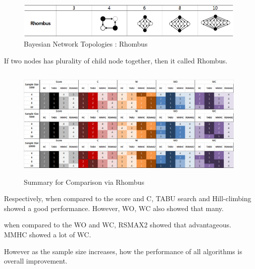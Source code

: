	\begin{figure}[h]
	\centering
		\includegraphics[height=50pt]{images/Topologies_Rhombus}
		\caption{Bayesian Network Topologies : Rhombus}
	\end{figure}	

	If two nodes has plurality of child node together, then it called Rhombus.

\begin{figure}[!bhp]
	\centering
		\includegraphics[height=155pt]{images/Result_Rhombus}
		\caption{Summary for Comparison via Rhombus}
	\end{figure}	

Respectively, when compared to the score and C,  TABU search and Hill-climbing showed a good performance. However, WO, WC also showed that many.

when compared to the WO and WC, RSMAX2 showed that advantageous. MMHC showed a lot of WC.

However as the sample size increases, how the performance of all algorithms is overall improvement.
	
